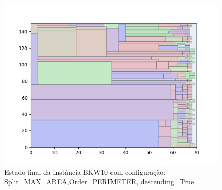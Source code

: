 \begin{figure}[H]
    \centering
    \caption[]{Estado final da instância BKW10 com configuração: Split=MAX_AREA,Order=PERIMETER, descending=True}
    \label{fig:bkw10-max_area-perimeter-true}
    \includegraphics[scale=0.5]{output/figures/bkw/bkw10/max_area/perimeter/true/000}
\end{figure}